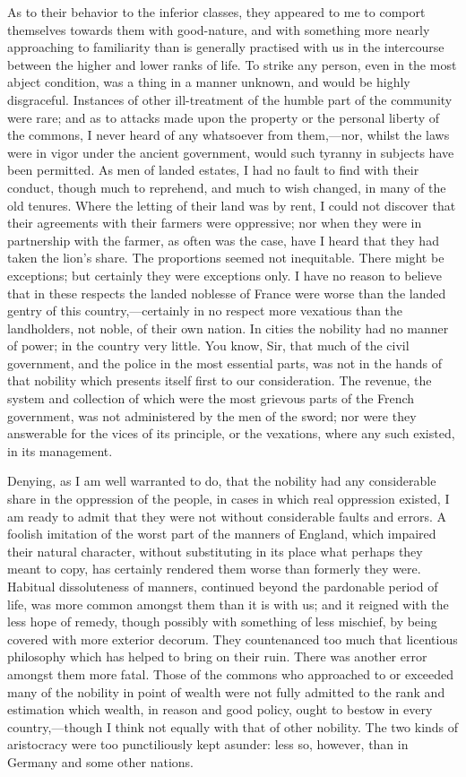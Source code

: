 As to their behavior to the inferior classes, they appeared to me to comport themselves towards them with good-nature, and with something more nearly approaching to familiarity than is generally practised with us in the intercourse between the higher and lower ranks of life. To strike any person, even in the most abject condition, was a thing in a manner unknown, and would be highly disgraceful. Instances of other ill-treatment of the humble part of the community were rare; and as to attacks made upon the property or the personal liberty of the commons, I never heard of any whatsoever from them,—nor, whilst the laws were in vigor under the ancient government, would such tyranny in subjects have been permitted. As men of landed estates, I had no fault to find with their conduct, though much to reprehend, and much to wish changed, in many of the old tenures. Where the letting of their land was by rent, I could not discover that their agreements with their farmers were oppressive; nor when they were in partnership with the farmer, as often was the case, have I heard that they had taken the lion's share. The proportions seemed not inequitable. There might be exceptions; but certainly they were exceptions only. I have no reason to believe that in these respects the landed noblesse of France were worse than the landed gentry of this country,—certainly in no respect more vexatious than the landholders, not noble, of their own nation. In cities the nobility had no manner of power; in the country very little. You know, Sir, that much of the civil government, and the police in the most essential parts, was not in the hands of that nobility which presents itself first to our consideration. The revenue, the system and collection of which were the most grievous parts of the French government, was not administered by the men of the sword; nor were they answerable for the vices of its principle, or the vexations, where any such existed, in its management.

Denying, as I am well warranted to do, that the nobility had any considerable share in the oppression of the people, in cases in which real oppression existed, I am ready to admit that they were not without considerable faults and errors. A foolish imitation of the worst part of the manners of England, which impaired their natural character, without substituting in its place what perhaps they meant to copy, has certainly rendered them worse than formerly they were. Habitual dissoluteness of manners, continued beyond the pardonable period of life, was more common amongst them than it is with us; and it reigned with the less hope of remedy, though possibly with something of less mischief, by being covered with more exterior decorum. They countenanced too much that licentious philosophy which has helped to bring on their ruin. There was another error amongst them more fatal. Those of the commons who approached to or exceeded many of the nobility in point of wealth were not fully admitted to the rank and estimation which wealth, in reason and good policy, ought to bestow in every country,—though I think not equally with that of other nobility. The two kinds of aristocracy were too punctiliously kept asunder: less so, however, than in Germany and some other nations.

